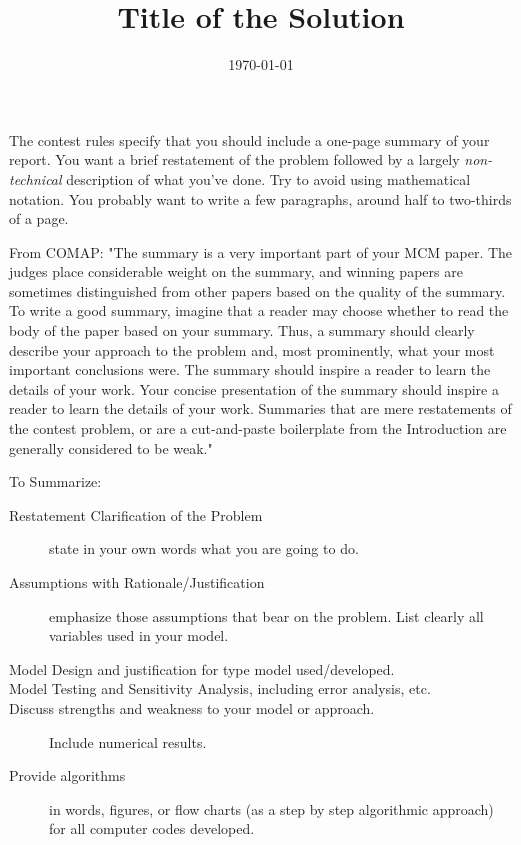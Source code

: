 \documentclass[12pt]{reedmcm}
\title{\textbf{Title of the Solution}}
\date{\today}
\begin{document}
\begin{summary}
  The contest rules specify that you should include a one-page summary of your report. 
  You want a brief restatement of the problem followed by a largely \emph{non-technical} description of what you've done.
  Try to avoid using mathematical notation.
  You probably want to write a few paragraphs, around half to two-thirds of a page.

  From COMAP: 
  "The summary is a very important part of your MCM paper. The
    judges place considerable weight on the summary, and winning
    papers are sometimes distinguished from other papers based on
    the quality of the summary. To write a good summary, imagine
    that a reader may choose whether to read the body of the paper
    based on your summary. Thus, a summary should clearly describe
    your approach to the problem and, most prominently, what your
    most important conclusions were. The summary should inspire a
    reader to learn the details of your work.  Your concise
    presentation of the summary should inspire a reader to learn
    the details of your work. Summaries that are mere restatements
    of the contest problem, or are a cut-and-paste boilerplate
    from the Introduction are generally considered to be
    weak."

    To Summarize:
    \begin{description}
      \item[Restatement Clarification of the Problem]
        state in your own words what you are going to do.
      \item[Assumptions with Rationale/Justification]
        emphasize those assumptions that bear on the problem. List clearly all variables used in your model.
      \item[Model Design and justification for type model used/developed.]
      \item[Model Testing and Sensitivity Analysis, including error
        analysis, etc.]
      \item[Discuss strengths and weakness to your model or approach.] Include numerical results.
      \item[Provide algorithms] in words, figures, or flow charts (as a step by step algorithmic approach) for all computer codes developed.
    \end{description}
  \end{summary}

\maketitle
\tableofcontents
\end{document}
